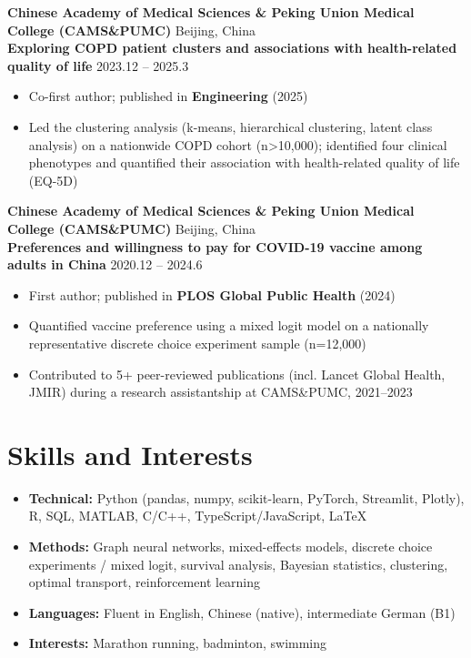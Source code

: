 \documentclass[10.5pt,letterpaper]{article}
\newcommand{\subentrytitle}[2]{%
  \textbf{#1} \hfill #2\\[1pt]
}
\begin{document}
\subentrytitle{Chinese Academy of Medical Sciences \& Peking Union Medical College (CAMS\&PUMC)}{Beijing, China}
\subentrytitle{Exploring COPD patient clusters and associations with health-related quality of life}{2023.12 -- 2025.3}
\begin{itemize}[leftmargin=18pt,itemsep=1pt,topsep=2pt]
  \item Co-first author; published in \textbf{Engineering} (2025)
  \item Led the clustering analysis (k-means, hierarchical clustering, latent class analysis) on a nationwide COPD cohort (n\textgreater10,000); identified four clinical phenotypes and quantified their association with health-related quality of life (EQ-5D)
\end{itemize}

\subentrytitle{Chinese Academy of Medical Sciences \& Peking Union Medical College (CAMS\&PUMC)}{Beijing, China}
\subentrytitle{Preferences and willingness to pay for COVID-19 vaccine among adults in China}{2020.12 -- 2024.6}
\begin{itemize}[leftmargin=18pt,itemsep=1pt,topsep=2pt]
  \item First author; published in \textbf{PLOS Global Public Health} (2024)
  \item Quantified vaccine preference using a mixed logit model on a nationally representative discrete choice experiment sample (n=12,000)
  \item Contributed to 5+ peer-reviewed publications (incl. Lancet Global Health, JMIR) during a research assistantship at CAMS\&PUMC, 2021--2023
\end{itemize}

\section*{Skills and Interests}

\begin{itemize}[leftmargin=18pt,itemsep=1pt,topsep=2pt]
  \item \textbf{Technical:} Python (pandas, numpy, scikit-learn, PyTorch, Streamlit, Plotly), R, SQL, MATLAB, C/C++, TypeScript/JavaScript, LaTeX
  \item \textbf{Methods:} Graph neural networks, mixed-effects models, discrete choice experiments / mixed logit, survival analysis, Bayesian statistics, clustering, optimal transport, reinforcement learning
  \item \textbf{Languages:} Fluent in English, Chinese (native), intermediate German (B1)
  \item \textbf{Interests:} Marathon running, badminton, swimming
\end{itemize}
\end{document}
